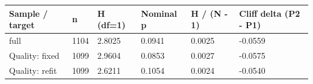 \begin{tabular}{llllll}
\toprule
Sample / target & n & H (df=1) & Nominal p & H / (N - 1) & Cliff delta (P2 - P1) \\
\midrule
full & 1104 & 2.8025 & 0.0941 & 0.0025 & -0.0559 \\
Quality: fixed & 1099 & 2.9604 & 0.0853 & 0.0027 & -0.0575 \\
Quality: refit & 1099 & 2.6211 & 0.1054 & 0.0024 & -0.0540 \\
\bottomrule
\end{tabular}
